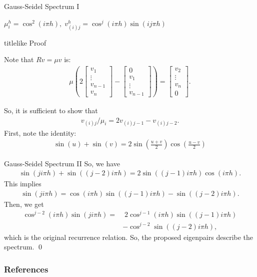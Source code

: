 \documentclass{beamer}
\begin{document}
\begin{frame}[label=gaussSeidelProof]{Gauss-Seidel Spectrum I}
 \begin{theorem}
  $\mu_i^h = \cos^2(i\pi h), \; v_{(i)j}^h = \cos^j(i\pi h)\sin(ij\pi h)$
 \end{theorem}
  \begin{beamercolorbox}{titlelike}
   Proof
  \end{beamercolorbox}
  
  Note that $Rv=\mu v$ is:
  \begin{align}
   \mu\left(2 \begin{bmatrix}v_1\\ \vdots \\ v_{n-1} \\ v_n \end{bmatrix} - \begin{bmatrix} 0 \\ v_1 \\ \vdots \\ v_{n-1} \end{bmatrix} \right) = \begin{bmatrix}v_2\\ \vdots \\ v_n \\ 0\end{bmatrix}.
  \end{align}

  So, it is sufficient to show that
  \begin{align}
   v_{(i)j}/\mu_i = 2v_{(i)j-1} - v_{(i)j-2}. \nonumber
  \end{align}
  First, note the identity:
  \begin{align}
   \sin(u)+\sin(v) = 2\sin\left(\frac{u+v}{2}\right)\cos\left(\frac{u-v}{2}\right) \nonumber
  \end{align}
\end{frame}
\begin{frame}{Gauss-Seidel Spectrum II}
  So, we have
  \begin{align}
   \sin(ji\pi h) + \sin((j-2)i\pi h) = 2 \sin\left( (j-1)i\pi h \right) \cos\left( i\pi h \right). \nonumber
  \end{align}
  This implies
  \begin{align}
   \sin(ji\pi h) = \cos(i \pi h) \sin((j-1)i\pi h) - \sin((j-2)i\pi h). \nonumber
  \end{align}
  Then, we get
  \begin{align}
   \cos^{j-2}(i\pi h)\sin(ji\pi h) =& \; 2\cos^{j-1}(i \pi h) \sin((j-1)i\pi h) \nonumber \\
                                      &- \cos^{j-2}\sin((j-2)i\pi h), \nonumber
  \end{align}
  which is the original recurrence relation.
  So, the proposed eigenpairs describe the spectrum.
  \qed \\
  \hyperlink{gaussSeidel}{}
\end{frame}

\begin{frame}[allowframebreaks]
 \frametitle{References}
 
 
\end{frame}
\end{document}
